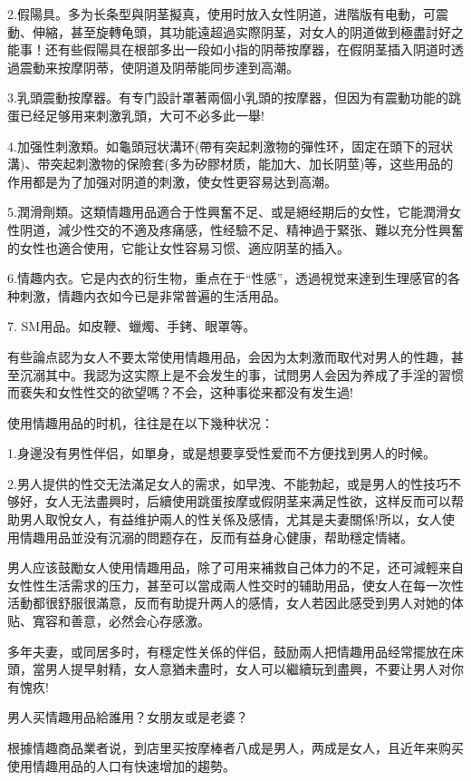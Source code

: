 \documentclass[12pt,UTF8]{ctexbook}
\begin{document}
2.假陽具。多为长条型與阴茎擬真，使用时放入女性阴道，进階版有电動，可震動、伸縮，甚至旋轉龟頭，其功能遠超過实際阴茎，对女人的阴道做到極盡討好之能事！还有些假陽具在根部多出一段如小指的阴蒂按摩器，在假阴茎插入阴道时透過震動来按摩阴蒂，使阴道及阴蒂能同步達到高潮。

3.乳頭震動按摩器。有专门設計罩著兩個小乳頭的按摩器，但因为有震動功能的跳蛋已经足够用来刺激乳頭，大可不必多此一舉!

4.加强性刺激類。如龜頭冠状溝环(帶有突起刺激物的彈性环，固定在頭下的冠状溝)、带突起刺激物的保險套(多为矽膠材质，能加大、加长阴莖)等，这些用品的作用都是为了加强对阴道的刺激，使女性更容易达到高潮。

5.潤滑劑類。这類情趣用品適合于性興奮不足、或是絕经期后的女性，它能潤滑女性阴道，減少性交的不適及疼痛感，性经驗不足、精神過于緊张、難以充分性興奮的女性也適合使用，它能让女性容易习惯、適应阴茎的插入。

6.情趣内衣。它是内衣的衍生物，重点在于“性感”，透過視觉来達到生理感官的各种刺激，情趣内衣如今已是非常普遍的生活用品。

7. SM用品。如皮鞭、蠟燭、手銬、眼罩等。

有些論点認为女人不要太常使用情趣用品，会因为太刺激而取代对男人的性趣，甚至沉溺其中。我認为这实際上是不会发生的事，试問男人会因为养成了手淫的習惯而裵失和女性性交的欲望嗎？不会，这种事從来都没有发生過!

使用情趣用品的时机，往往是在以下幾种状况：

1.身邊没有男性伴侣，如單身，或是想要享受性爱而不方便找到男人的时候。

2.男人提供的性交无法滿足女人的需求，如早洩、不能勃起，或是男人的性技巧不够好，女人无法盡興时，后續使用跳蛋按摩或假阴茎来满足性欲，这样反而可以帮助男人取悅女人，有益维护兩人的性关係及感情，尤其是夫妻關係!所以，女人使用情趣用品並没有沉溺的問题存在，反而有益身心健康，帮助穩定情緒。

男人应该鼓勵女人使用情趣用品，除了可用来補救自己体力的不足，还可減輕来自女性性生活需求的压力，甚至可以當成兩人性交时的辅助用品，使女人在每一次性活動都很舒服很滿意，反而有助提升两人的感情，女人若因此感受到男人对她的体贴、寬容和善意，必然会心存感激。

多年夫妻，或同居多时，有穩定性关係的伴侣，鼓励兩人把情趣用品经常擺放在床頭，當男人提早射精，女人意猶未盡时，女人可以繼續玩到盡興，不要让男人对你有愧疚!

男人买情趣用品給誰用？女朋友或是老婆？

根據情趣商品業者说，到店里买按摩棒者八成是男人，两成是女人，且近年来购买使用情趣用品的人口有快速增加的趨勢。
\end{document}
